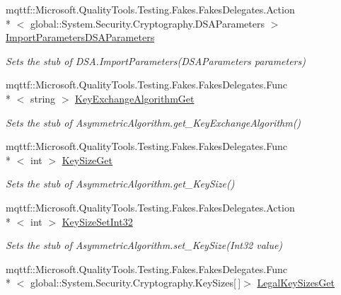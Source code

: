\begin{DoxyCompactItemize}
mqttf\-::\-Microsoft.\-Quality\-Tools.\-Testing.\-Fakes.\-Fakes\-Delegates.\-Action\\*
$<$ global\-::\-System.\-Security.\-Cryptography.\-D\-S\-A\-Parameters $>$ \hyperlink{class_system_1_1_security_1_1_cryptography_1_1_fakes_1_1_stub_d_s_a_ac08dd8b2511de536e3da5fb36838f152}{Import\-Parameters\-D\-S\-A\-Parameters}
\begin{DoxyCompactList}\small\item\em Sets the stub of D\-S\-A.\-Import\-Parameters(\-D\-S\-A\-Parameters parameters)\end{DoxyCompactList}\item 
mqttf\-::\-Microsoft.\-Quality\-Tools.\-Testing.\-Fakes.\-Fakes\-Delegates.\-Func\\*
$<$ string $>$ \hyperlink{class_system_1_1_security_1_1_cryptography_1_1_fakes_1_1_stub_d_s_a_a2d708bd7ad625ce60176340778afaacb}{Key\-Exchange\-Algorithm\-Get}
\begin{DoxyCompactList}\small\item\em Sets the stub of Asymmetric\-Algorithm.\-get\-\_\-\-Key\-Exchange\-Algorithm()\end{DoxyCompactList}\item 
mqttf\-::\-Microsoft.\-Quality\-Tools.\-Testing.\-Fakes.\-Fakes\-Delegates.\-Func\\*
$<$ int $>$ \hyperlink{class_system_1_1_security_1_1_cryptography_1_1_fakes_1_1_stub_d_s_a_a95ebf784fc6ff29aef6d62ad37cb04c9}{Key\-Size\-Get}
\begin{DoxyCompactList}\small\item\em Sets the stub of Asymmetric\-Algorithm.\-get\-\_\-\-Key\-Size()\end{DoxyCompactList}\item 
mqttf\-::\-Microsoft.\-Quality\-Tools.\-Testing.\-Fakes.\-Fakes\-Delegates.\-Action\\*
$<$ int $>$ \hyperlink{class_system_1_1_security_1_1_cryptography_1_1_fakes_1_1_stub_d_s_a_a0714fd85b4d3424723cb301133c0b37a}{Key\-Size\-Set\-Int32}
\begin{DoxyCompactList}\small\item\em Sets the stub of Asymmetric\-Algorithm.\-set\-\_\-\-Key\-Size(\-Int32 value)\end{DoxyCompactList}\item 
mqttf\-::\-Microsoft.\-Quality\-Tools.\-Testing.\-Fakes.\-Fakes\-Delegates.\-Func\\*
$<$ global\-::\-System.\-Security.\-Cryptography.\-Key\-Sizes\mbox{[}$\,$\mbox{]}$>$ \hyperlink{class_system_1_1_security_1_1_cryptography_1_1_fakes_1_1_stub_d_s_a_af1f9f0c7e53d84c28821cc8045e3b023}{Legal\-Key\-Sizes\-Get}

\end{DoxyCompactItemize}
